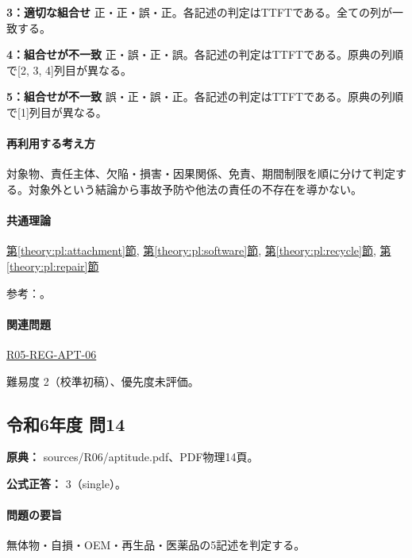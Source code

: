 \noindent\textbf{3：適切な組合せ} 正・正・誤・正。各記述の判定はTTFTである。全ての列が一致する。\par

\noindent\textbf{4：組合せが不一致} 正・誤・正・誤。各記述の判定はTTFTである。原典の列順で[2, 3, 4]列目が異なる。\par

\noindent\textbf{5：組合せが不一致} 誤・正・誤・正。各記述の判定はTTFTである。原典の列順で[1]列目が異なる。\par

\paragraph{再利用する考え方} 対象物、責任主体、欠陥・損害・因果関係、免責、期間制限を順に分けて判定する。対象外という結論から事故予防や他法の責任の不存在を導かない。

\paragraph{共通理論} \hyperref[theory:pl:attachment]{第\ref*{theory:pl:attachment}節}, \hyperref[theory:pl:software]{第\ref*{theory:pl:software}節}, \hyperref[theory:pl:recycle]{第\ref*{theory:pl:recycle}節}, \hyperref[theory:pl:repair]{第\ref*{theory:pl:repair}節}

\par 参考：\cite{pl_statute,pl_qa,pl_definitions2018}。

\paragraph{関連問題} \hyperref[q:r05-reg-apt-06]{R05-REG-APT-06}

\par 難易度 2（校準初稿）、優先度未評価。

\subsection{令和6年度 問14}
\label{q:r06-reg-apt-14}

\noindent\textbf{原典：} sources/R06/aptitude.pdf、PDF物理14頁。

\textbf{公式正答：} 3（single）。

\paragraph{問題の要旨} 無体物・自損・OEM・再生品・医薬品の5記述を判定する。

